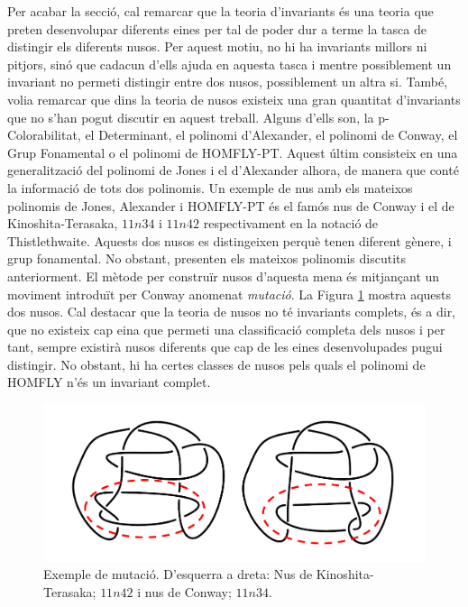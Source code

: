 Per acabar la secció, cal remarcar que la teoria d'invariants és una teoria que preten desenvolupar diferents eines per tal de poder dur a terme la tasca de distingir els diferents nusos. Per aquest motiu, no hi ha invariants millors ni pitjors, sinó que cadacun d'ells ajuda en aquesta tasca i mentre possiblement un invariant no permeti distingir entre dos nusos, possiblement un altra si. També, volia remarcar que dins la teoria de nusos existeix una gran quantitat d'invariants que no s'han pogut discutir en aquest treball. Alguns d'ells son, la p-Colorabilitat, el Determinant, el polinomi d'Alexander, el polinomi de Conway, el Grup Fonamental o el polinomi de HOMFLY-PT. Aquest últim consisteix en una generalització del polinomi de Jones i el d'Alexander alhora, de manera que conté la informació de tots dos polinomis. Un exemple de nus amb els mateixos polinomis de Jones, Alexander i HOMFLY-PT és el famós nus de Conway i el de Kinoshita-Terasaka, $11n34$ i $11n42$ respectivament en la notació de Thistlethwaite. Aquests dos nusos es distingeixen perquè tenen diferent gènere, i grup fonamental. No obstant, presenten els mateixos polinomis discutits anteriorment. El mètode per construïr nusos d'aquesta mena és mitjançant un moviment introduït per Conway anomenat \textit{mutació}. La Figura \ref{fig:mutacio} mostra aquests dos nusos. Cal destacar que la teoria de nusos no té invariants complets, és a dir, que no existeix cap eina que permeti una classificació completa dels nusos i per tant, sempre existirà nusos diferents que cap de les eines desenvolupades pugui distingir. No obstant, hi ha certes classes de nusos pels quals el polinomi de HOMFLY n'és un invariant complet.

\begin{figure}
	\centering
	\includegraphics[width=\linewidth]{img/mutació.png}
	\caption{Exemple de mutació. D'esquerra a dreta: Nus de Kinoshita-Terasaka; $11n42$ i nus de Conway; $11n34$.}\label{fig:mutacio}
\end{figure}